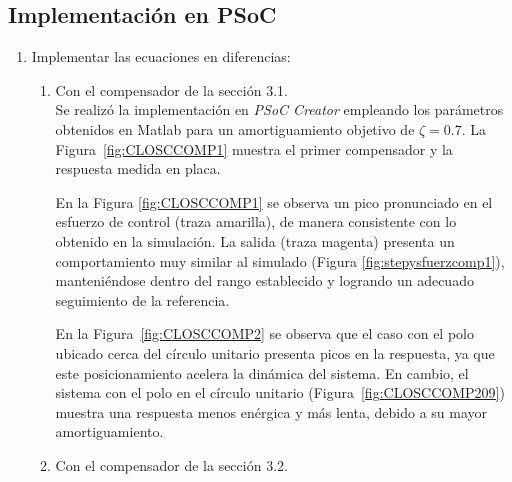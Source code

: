 \newpage
\onecolumn

\subsection{Implementación en PSoC}
\begin{enumerate}[label=4.\arabic*.]
	\item Implementar las ecuaciones en diferencias:
	
	\begin{enumerate}[label*=4.\arabic*.]
			\item Con el compensador de la sección 3.1.\\
			Se realizó la implementación en \textit{PSoC Creator} empleando los parámetros obtenidos en Matlab para un amortiguamiento objetivo de $\zeta = 0.7$. La Figura~\ref{fig:CLOSCCOMP1} muestra el primer compensador y la respuesta medida en placa.

			
			En la Figura \ref{fig:CLOSCCOMP1} se observa un pico pronunciado en el esfuerzo de control (traza amarilla), de manera consistente con lo obtenido en la simulación. La salida (traza magenta) presenta un comportamiento muy similar al simulado (Figura \ref{fig:stepysfuerzcomp1}), manteniéndose dentro del rango establecido y logrando un adecuado seguimiento de la referencia.
			
			
			
			En la Figura~\ref{fig:CLOSCCOMP2} se observa que el caso con el polo ubicado cerca del círculo unitario presenta picos en la respuesta, ya que este posicionamiento acelera la dinámica del sistema. En cambio, el sistema con el polo en el círculo unitario (Figura~\ref{fig:CLOSCCOMP209}) muestra una respuesta menos enérgica y más lenta, debido a su mayor amortiguamiento.
			\item Con el compensador de la sección 3.2.
			

\end{enumerate}
\end{enumerate}
